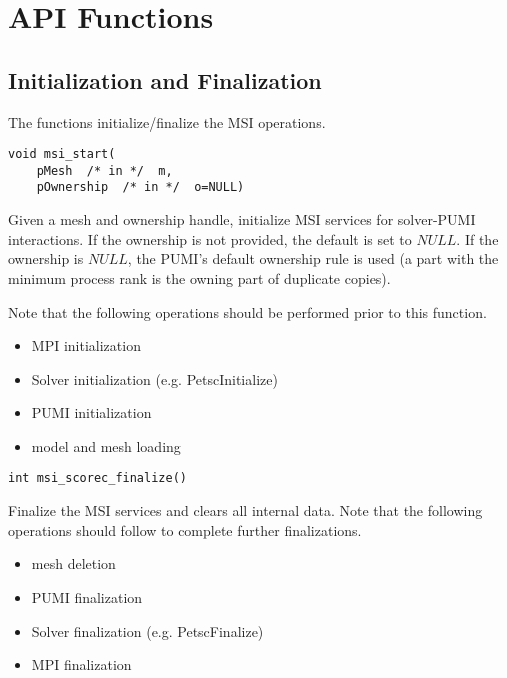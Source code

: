 \section{API Functions}

\subsection{Initialization and Finalization}

The functions initialize/finalize the MSI operations.

\begin{verbatim}
void msi_start(
    pMesh  /* in */  m, 
    pOwnership  /* in */  o=NULL)
\end{verbatim}\vspace{-.5cm}\hspace{1cm}
Given a mesh and ownership handle, initialize MSI services for solver-PUMI interactions. If the ownership is not provided, the default is set to $NULL$. If the ownership is $NULL$, the PUMI's default ownership rule is used (a part with the minimum process rank is the owning part of duplicate copies). 

Note that the following operations should be performed prior to this function.
\begin{itemize}
\item MPI initialization
\item Solver initialization (e.g. PetscInitialize)
\item PUMI initialization 
\item model and mesh loading
\end{itemize}

\begin{verbatim}
int msi_scorec_finalize()
\end{verbatim}\vspace{-.5cm}\hspace{1cm}
Finalize the MSI services and clears all internal data. Note that the following operations should follow to complete further finalizations.
\begin{itemize}
\item mesh deletion
\item PUMI finalization
\item Solver finalization (e.g. PetscFinalize)
\item MPI finalization
\end{itemize}

